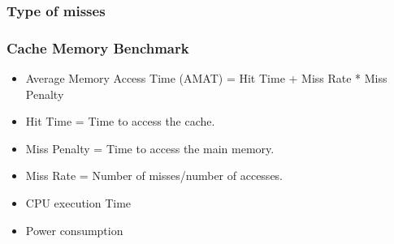 \begin{frame}
    \frametitle{Type of misses}
\end{frame}

\begin{frame}
    \frametitle{Cache Memory Benchmark}
    \begin{itemize}
        \item Average Memory Access Time (AMAT) = Hit Time + Miss Rate * Miss Penalty
        \item Hit Time = Time to access the cache.
        \item Miss Penalty = Time to access the main memory.
        \item Miss Rate = Number of misses/number of accesses.
        \item CPU execution Time
        \item Power consumption
    \end{itemize}
\end{frame}